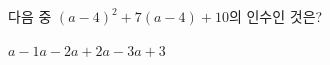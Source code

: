 다음 중 $(a-4)^2+7(a-4)+10$의 인수인 것은?
\begin{choices32}{$a-1$}{$a-2$}{$a+2$}{$a-3$}{$a+3$}\end{choices32}
